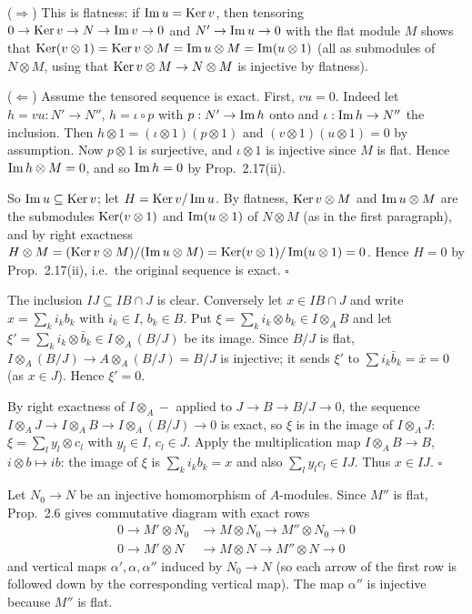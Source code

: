 \documentclass[11pt]{article}
\begin{document}
($\Rightarrow$) This is flatness: if $\operatorname{Im} u=\operatorname{Ker} v$, then tensoring $0\to \operatorname{Ker} v\to N\to \operatorname{Im} v\to0$ and $N'\to\operatorname{Im} u\to 0$ with the flat module $M$ shows that $\operatorname{Ker}(v\otimes1)=\operatorname{Ker} v\otimes M=\operatorname{Im} u\otimes M=\operatorname{Im}(u\otimes 1)$ (all as submodules of $N\otimes M$, using that $\operatorname{Ker} v\otimes M\to N\otimes M$ is injective by flatness).

($\Leftarrow$) Assume the tensored sequence is exact. First, $vu=0$. Indeed let $h=vu:N'\to N''$, $h=\iota\circ p$ with $p:N'\to\operatorname{Im} h$ onto and $\iota:\operatorname{Im} h\to N''$ the inclusion. Then $h\otimes1=(\iota\otimes1)(p\otimes1)$ and $(v\otimes1)(u\otimes1)=0$ by assumption. Now $p\otimes1$ is surjective, and $\iota\otimes1$ is injective since $M$ is flat. Hence $\operatorname{Im} h\otimes M=0$, and so $\operatorname{Im} h=0$ by Prop.~2.17(ii).

So $\operatorname{Im} u\subseteq\operatorname{Ker} v$; let $H=\operatorname{Ker} v/\operatorname{Im} u$. By flatness, $\operatorname{Ker} v\otimes M$ and $\operatorname{Im} u\otimes M$ are the submodules $\operatorname{Ker}(v\otimes1)$ and $\operatorname{Im}(u\otimes1)$ of $N\otimes M$ (as in the first paragraph), and by right exactness $H\otimes M=(\operatorname{Ker} v\otimes M)/(\operatorname{Im} u\otimes M)=\operatorname{Ker}(v\otimes1)/\operatorname{Im}(u\otimes1)=0$. Hence $H=0$ by Prop.~2.17(ii), i.e.\ the original sequence is exact. \hfill$\square$

\pf
The inclusion $IJ\subseteq IB\cap J$ is clear. Conversely let $x\in IB\cap J$ and write $x=\sum_k i_kb_k$ with $i_k\in I$, $b_k\in B$. Put $\xi=\sum_k i_k\otimes b_k\in I\otimes_AB$ and let $\xi'=\sum_k i_k\otimes\bar b_k\in I\otimes_A(B/J)$ be its image. Since $B/J$ is flat, $I\otimes_A(B/J)\to A\otimes_A (B/J)=B/J$ is injective; it sends $\xi'$ to $\sum i_k\bar b_k=\bar x=0$ (as $x\in J$). Hence $\xi'=0$.

By right exactness of $I\otimes_A-$ applied to $J\to B\to B/J\to 0$, the sequence $I\otimes_AJ\to I\otimes_AB\to I\otimes_A(B/J)\to0$ is exact, so $\xi$ is in the image of $I\otimes_A J$: $\xi=\sum_l y_l\otimes c_l$ with $y_l\in I$, $c_l\in J$. Apply the multiplication map $I\otimes_AB\to B$, $i\otimes b\mapsto ib$: the image of $\xi$ is $\sum_k i_kb_k=x$ and also $\sum_l y_lc_l\in IJ$. Thus $x\in IJ$. \hfill$\square$

\pf
Let $N_0\to N$ be an injective homomorphism of $A$-modules. Since $M''$ is flat, Prop.~2.6 gives commutative diagram with exact rows
\begin{align*}
0\to M'\otimes N_0&\to M\otimes N_0\to M''\otimes N_0\to 0\\
0\to M'\otimes N&\to M\otimes N\to M''\otimes N\to 0
\end{align*}
and vertical maps $\alpha',\alpha,\alpha''$ induced by $N_0\to N$ (so each arrow of the first row is followed down by the corresponding vertical map). The map $\alpha''$ is injective because $M''$ is flat.
\end{document}
